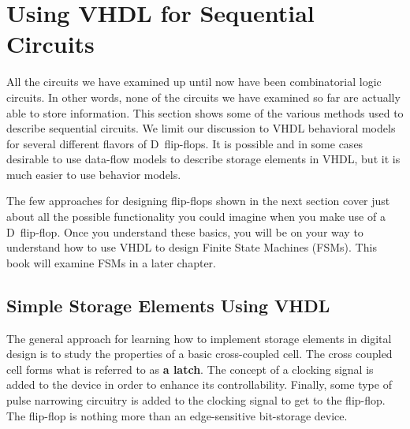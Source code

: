 %
%
\chapter{Using VHDL for Sequential Circuits}
All the circuits we have examined up until now have been combinatorial logic circuits. In other words, none of the circuits we have examined so far are actually able to store information. This section shows some of the various methods used to describe sequential circuits. We limit our discussion to VHDL behavioral models for several different flavors of D~flip-flops. It is possible and in some cases desirable to use data-flow models to describe storage elements in VHDL, but it is much easier to use behavior models.

The few approaches for designing flip-flops shown in the next section cover just about all the possible functionality you could imagine when you make use of a D~flip-flop. Once you understand these basics, you will be on your way to understand how to use VHDL to design Finite State Machines (FSMs). This book will examine FSMs in a later chapter.

\section{Simple Storage Elements Using VHDL}
The general approach for learning how to implement storage elements in digital design is to study the properties of a basic cross-coupled cell. The cross coupled cell forms what is referred to as \textbf{a latch}. The concept of a clocking signal is added to the device in order to enhance its controllability. Finally, some type of pulse narrowing circuitry is added to the clocking signal to get to the flip-flop. The flip-flop is nothing more than an edge-sensitive bit-storage device.


